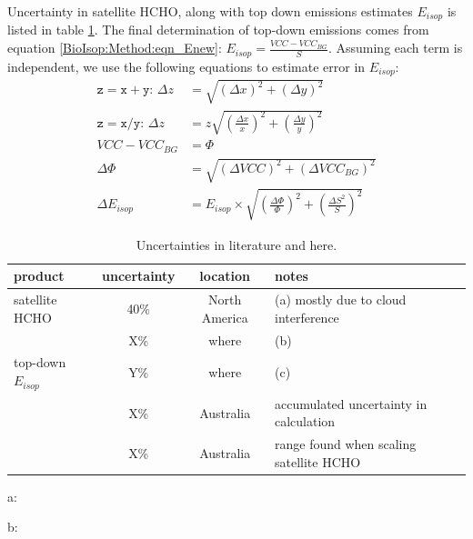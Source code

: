   Uncertainty in satellite HCHO, along with top down emissions estimates $E_{isop}$ is listed in table \ref{Model:Uncertainty:tab_uncertainties}.
  The final determination of top-down emissions comes from equation \ref{BioIsop:Method:eqn_Enew}: $E_{isop}=\frac{VCC - VCC_{BG}}{S}$.
  Assuming each term is independent, we use the following equations to estimate error in $E_{isop}$:
  \begin{align*}
    \mathtt{z=x+y:} \, \Delta{z} & = \sqrt{(\Delta{x})^2 + (\Delta{y})^2} \\
    \mathtt{z=x/y:} \, \Delta{z} & = z \sqrt{(\frac{\Delta{x}}{x})^2 + (\frac{\Delta{y}}{y})^2} \\
    VCC - VCC_{BG} & = \Phi \\
    \Delta{\Phi} & = \sqrt{(\Delta{VCC})^2 + (\Delta{VCC_{BG}})^2} \\
    \Delta{E_{isop}} &= E_{isop} \times \sqrt{(\frac{\Delta{\Phi}}{\Phi})^2 + (\frac{\Delta{S}^2}{S})^2}
  \end{align*}
  \begin{table}\begin{threeparttable}
    \caption{Uncertainties in literature and here.}
    \begin{tabular}{ l | c  c  l } 
      \toprule
      product & uncertainty & location & notes \\
      \midrule
      satellite HCHO & 40\% & North America & (a) mostly due to cloud interference \\
       & X\% & where & (b) \\
      top-down $E_{isop}$ & Y\% & where & (c) \\
       & X\% & Australia & accumulated uncertainty in calculation \\
       & X\% & Australia & range found when scaling satellite HCHO \\
      \bottomrule
    \end{tabular}
    \begin{tablenotes} 
      \item a: \textcite{Millet2006,Palmer2006}
      \item b: 
    \end{tablenotes}
    \label{Model:Uncertainty:tab_uncertainties}
  \end{threeparttable}\end{table}
  
